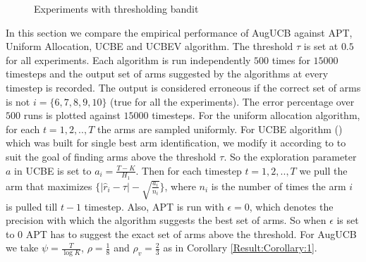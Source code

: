 \begin{figure}
\begin{tabular}{cc}
    \end{tabular}
    \caption{Experiments with thresholding bandit}
    \label{fig:budgetExpt}
\end{figure}


	In this section we compare the empirical performance of AugUCB against APT, Uniform Allocation, UCBE and UCBEV algorithm. The threshold $\tau$ is set at $0.5$ for all experiments. Each algorithm is run independently $500$ times for $15000$ timesteps and the output set of arms suggested by the algorithms at every timestep is recorded. The output is considered erroneous if the correct set of arms is not $i=\lbrace 6,7,8,9,10 \rbrace$ (true for all the experiments). The error percentage over $500$ runs is plotted against $15000$ timesteps. For the uniform allocation algorithm, for each $t=1,2,..,T$ the arms are sampled uniformly. For UCBE algorithm  (\cite{audibert2009exploration}) which was built for single best arm identification, we modify it according to \cite{locatelli2016optimal} to suit the goal of finding arms above the threshold $\tau$. So the exploration parameter $a$ in UCBE is set to $a_{i}=\frac{T-K}{H_1}$. Then for each timestep $t=1,2,..,T$ we pull the arm that maximizes $\lbrace |\hat{r}_{i} -\tau|-\sqrt{\frac{a_{i}}{n_{i}}} \rbrace$, where $n_{i}$ is the number of times the arm $i$ is pulled till $t-1$ timestep. Also, APT is run with $\epsilon=0$, which denotes the precision with which the algorithm suggests the best set of arms. So when $\epsilon$ is  set to $0$ APT has to suggest the exact set of arms above the threshold. For AugUCB we take $\psi=\frac{T}{\log K}$, $\rho=\frac{1}{8}$ and $\rho_v=\frac{2}{3}$ as in Corollary \ref{Result:Corollary:1}.
	
